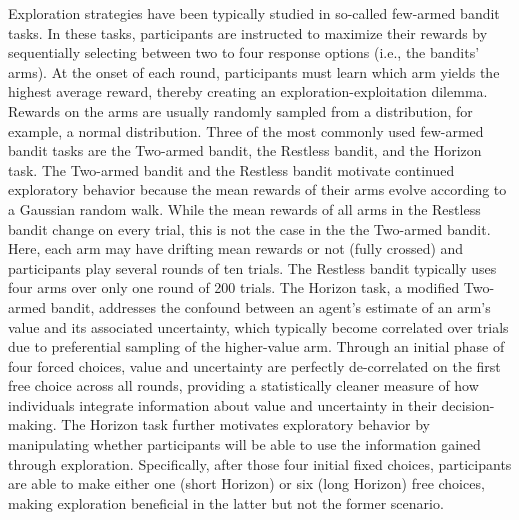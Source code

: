 \documentclass[fleqn,10pt]{wlscirep}
\begin{document}
Exploration strategies have been typically studied in so-called few-armed bandit tasks. In these tasks, participants are instructed to maximize their rewards by sequentially selecting between two to four response options (i.e., the bandits' arms). At the onset of each round, participants must learn which arm yields the highest average reward, thereby creating an exploration-exploitation dilemma. Rewards on the arms are usually randomly sampled from a distribution, for example, a normal distribution. Three of the most commonly used few-armed bandit tasks are the Two-armed bandit\cite{gershman_deconstructing_2018}, the Restless bandit\cite{daw_cortical_2006}, and the Horizon task\cite{wilson_humans_2014}.  The Two-armed bandit and the Restless bandit motivate continued exploratory behavior because the mean rewards of their arms evolve according to a Gaussian random walk. While the mean rewards of all arms in the Restless bandit change on every trial, this is not the case in the the Two-armed bandit. Here, each arm may have drifting mean rewards or not (fully crossed) and participants play several rounds of ten trials. The Restless bandit typically uses four arms over only one round of 200 trials. The Horizon task, a modified Two-armed bandit, addresses the confound between an agent's estimate of an arm's value and its associated uncertainty, which typically become correlated over trials due to preferential sampling of the higher-value arm. Through an initial phase of four forced choices, value and uncertainty are perfectly de-correlated on the first free choice across all rounds, providing a statistically cleaner measure of how individuals integrate information about value and uncertainty in their decision-making. The Horizon task further motivates exploratory behavior by manipulating whether participants will be able to use the information gained through exploration. Specifically, after those four initial fixed choices, participants are able to make either one (short Horizon) or six (long Horizon) free choices, making exploration beneficial in the latter but not the former scenario.
\end{document}
